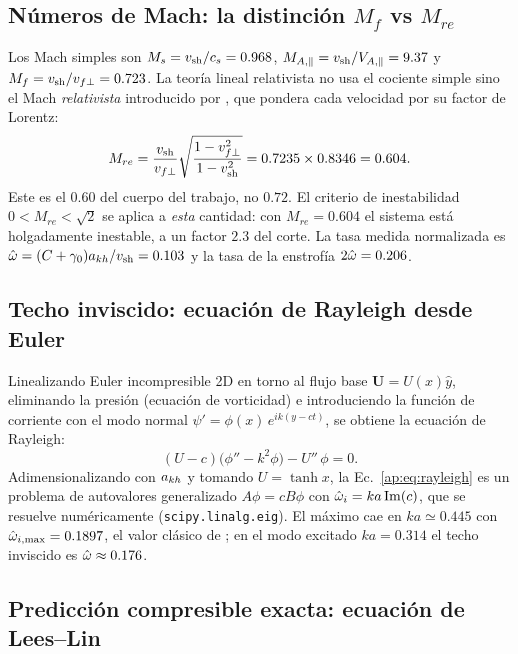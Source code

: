 \subsection{Números de Mach: la distinción $M_f$ vs $M_{re}$}
\label{ap:mach}

\primerparrafo Los Mach simples son $M_s=v_{\mathrm{sh}}/c_s=0.968$, $M_{A,\parallel}=v_{\mathrm{sh}}/V_{A,\parallel}=9.37$ y $M_f=v_{\mathrm{sh}}/v_{f\perp}=0.723$. La teoría lineal relativista \parencite{osmanov-2008,bodo-2004,chow2023} no usa el cociente simple sino el Mach \emph{relativista} introducido por \textcite{konigl1980}, que pondera cada velocidad por su factor de Lorentz:
\begin{equation}
M_{re}=\frac{v_{\mathrm{sh}}}{v_{f\perp}}\sqrt{\frac{1-v_{f\perp}^2}{1-v_{\mathrm{sh}}^2}}
=0.7235\times0.8346=0.604 .
\end{equation}
Este es el $0.60$ del cuerpo del trabajo, no $0.72$. El criterio de inestabilidad $0<M_{re}<\sqrt2$ \parencite{chow2023,bodo-2004} se aplica a \emph{esta} cantidad: con $M_{re}=0.604$ el sistema está holgadamente inestable, a un factor $2.3$ del corte. La tasa medida normalizada es $\hat{\omega}=(C+\gamma_0)a_{kh}/v_{\mathrm{sh}}=0.103$ y la tasa de la enstrofía $2\hat{\omega}=0.206$.

\subsection{Techo inviscido: ecuación de Rayleigh desde Euler}
\label{ap:rayleigh}

\primerparrafo Linealizando Euler incompresible 2D en torno al flujo base $\mathbf{U}=U(x)\hat y$, eliminando la presión (ecuación de vorticidad) e introduciendo la función de corriente con el modo normal $\psi'=\phi(x)\,e^{ik(y-ct)}$, se obtiene la ecuación de Rayleigh:
\begin{equation}
(U-c)\big(\phi''-k^2\phi\big)-U''\,\phi=0 .
\label{ap:eq:rayleigh}
\end{equation}
Adimensionalizando con $a_{kh}$ y tomando $U=\tanh x$, la Ec.~\eqref{ap:eq:rayleigh} es un problema de autovalores generalizado $A\phi=cB\phi$ con $\hat{\omega}_i=ka\,\mathrm{Im}(c)$, que se resuelve numéricamente (\texttt{scipy.linalg.eig}). El máximo cae en $ka\simeq0.445$ con $\hat{\omega}_{i,\max}=0.1897$, el valor clásico de \textcite{michalke1964}; en el modo excitado $ka=0.314$ el techo inviscido es $\hat{\omega}\approx0.176$.

\subsection{Predicción compresible exacta: ecuación de Lees--Lin}
\label{ap:leeslin}

